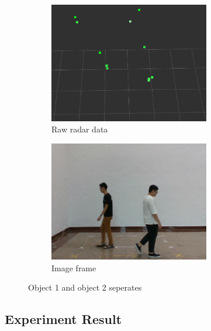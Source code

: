 \begin{figure}[hbpt]
    \centering
    \begin{subfigure}{0.3\linewidth}
        \includegraphics[width=7cm]{Figures/after_conceal_radar.png}
        \caption{Raw radar data}
        \label{subfig:after_conceal_radar_fig}
    \end{subfigure}
    \hspace{0.15\textwidth}
    \begin{subfigure}{0.3\linewidth}
        \includegraphics[width=7cm]{Figures/after_conceal_image.png}
        \caption{Image frame}
        \label{subfig:after_conceal_image_fig}
    \end{subfigure}

    \caption{Object 1 and object 2 seperates}
    \label{fig:after_conceal_fig}
\end{figure}


\subsection{Experiment Result}\label{sec:3-exp_result}
